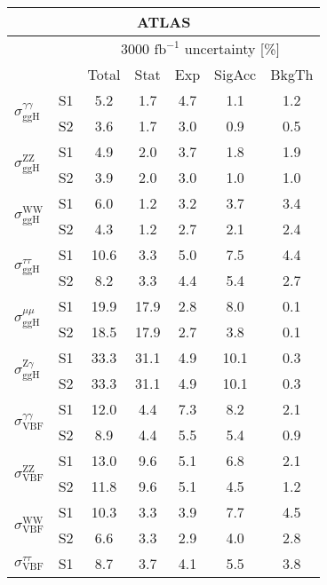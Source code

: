 \begin{tabular}{@{} l c c@{\hskip 0.15in} c c c c @{}}
  \hline
   \multicolumn{7}{c}{ATLAS}\\
 \hline
  &  & \multicolumn{5}{c}{3000 $\text{fb}^{-1}$ uncertainty [\%]} \\
  &  & Total & Stat & Exp & SigAcc & BkgTh \\
  \hline
  \multirow{2}{*}{$\sigma_{\mathrm{ggH}}^{\gamma \gamma }$} & S1 &5.2   & 1.7   & 4.7   & 1.1   & 1.2  \\[1pt] 
  & S2 &3.6   & 1.7   & 3.0   & 0.9   & 0.5  \\[4pt] 
  \multirow{2}{*}{$\sigma_{\mathrm{ggH}}^{\mathrm{ZZ}}$} & S1 &4.9   & 2.0   & 3.7   & 1.8   & 1.9  \\[1pt]
  & S2 &3.9   & 2.0   & 3.0   & 1.0   & 1.0  \\[4pt]
  \multirow{2}{*}{$\sigma_{\mathrm{ggH}}^{\mathrm{WW}}$} & S1 &6.0   & 1.2   & 3.2   & 3.7   & 3.4  \\[1pt]
  & S2 &4.3   & 1.2   & 2.7   & 2.1   & 2.4  \\[4pt]
  \multirow{2}{*}{$\sigma_{\mathrm{ggH}}^{\tau \tau }$} & S1 &10.6  & 3.3   & 5.0   & 7.5   & 4.4  \\[1pt]
  & S2 &8.2   & 3.3   & 4.4   & 5.4   & 2.7  \\[4pt]
  \multirow{2}{*}{$\sigma_{\mathrm{ggH}}^{\mu \mu}$} & S1  &19.9  & 17.9  & 2.8   & 8.0   & 0.1  \\[1pt]
  & S2 &18.5  & 17.9  & 2.7   & 3.8   & 0.1  \\[4pt]
  \multirow{2}{*}{$\sigma_{\mathrm{ggH}}^{\mathrm{Z} \gamma }$} & S1 &33.3  & 31.1  & 4.9   & 10.1  & 0.3  \\[1pt]
  & S2 &33.3  & 31.1  & 4.9   & 10.1  & 0.3  \\[4pt]
  \multirow{2}{*}{$\sigma_{\mathrm{VBF}}^{\gamma \gamma }$} & S1  &12.0  & 4.4   & 7.3   & 8.2   & 2.1  \\[1pt]
  & S2 &8.9   & 4.4   & 5.5   & 5.4   & 0.9  \\[4pt]
  \multirow{2}{*}{$\sigma_{\mathrm{VBF}}^{\mathrm{ZZ}}$} & S1 &13.0  & 9.6   & 5.1   & 6.8   & 2.1  \\[1pt]
  & S2 &11.8  & 9.6   & 5.1   & 4.5   & 1.2  \\[4pt]
  \multirow{2}{*}{$\sigma_{\mathrm{VBF}}^{\mathrm{WW}}$} & S1 &10.3  & 3.3   & 3.9   & 7.7   & 4.5  \\[1pt]
  & S2 &6.6   & 3.3   & 2.9   & 4.0   & 2.8  \\[4pt]
  \multirow{2}{*}{$\sigma_{\mathrm{VBF}}^{\tau \tau }$} & S1 &8.7   & 3.7   & 4.1   & 5.5   & 3.8  \\[1pt]

\end{tabular}
